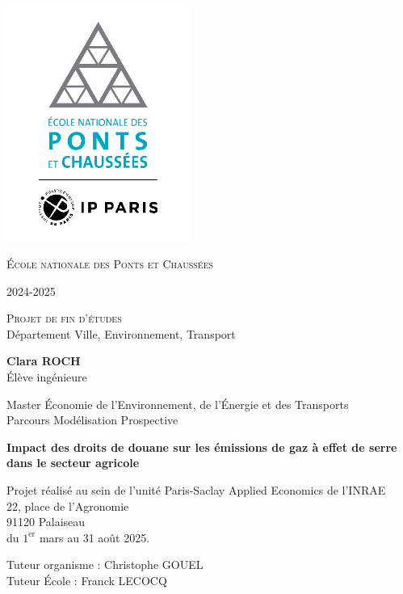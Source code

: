\begin{titlepage}
  \vspace*{-2.5cm}
  \begin{center}
    \includegraphics[width=6cm]{logo_ponts.png}\par
    {\LARGE \textsc{École nationale des Ponts et Chaussées}\par}

    2024-2025

    \vspace{0.5cm}
    {\Large \textsc{Projet de fin d’études}} \\
    Département Ville, Environnement, Transport

    \vspace{0.5cm}
    {\large \textbf{Clara ROCH}} \\
    Élève ingénieure

    Master Économie de l’Environnement, de l’Énergie et des Transports \\
    Parcours Modélisation Prospective

    \vspace{0.5cm}
    {\LARGE \bfseries {Impact des droits de douane sur les émissions de gaz à effet de serre dans le secteur agricole} \par}

    \vspace{1cm}
    Projet réalisé au sein de l'unité Paris-Saclay Applied Economics de l'INRAE \\
    22, place de l'Agronomie \\
    91120 Palaiseau \\
    du $1^{\text{er}}$ mars au 31 août 2025.

    \vspace{1cm}
    {\large Tuteur organisme : Christophe GOUEL \\
      Tuteur École : Franck LECOCQ}

  \end{center}
\end{titlepage}
